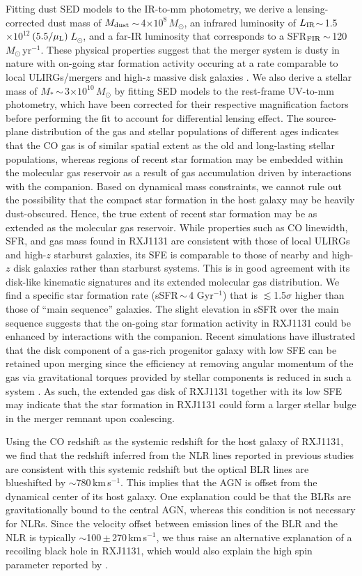 \documentclass[]{emulateapj}
\newcommand{\Msun}{\mbox{$M_{\odot}$}\xspace}
\newcommand{\Lsun}{\mbox{$L_{\odot}$}\xspace}
\newcommand{\LIR}{\mbox{$L_{\rm IR}$}\xspace}
\newcommand{\kms}{\mbox{km\,s$^{-1}$}\xspace}
\newcommand{\pmOne}{\mbox{$^{-1}$}\xspace}
\newcommand{\sfrU}{\mbox{\Msun\,yr$^{-1}$}\xspace}
\newcommand{\E}[1]{\mbox{$\times10^{#1}$}}
\newcommand{\ssim}{\,$\sim$\,}
\newcommand{\pmm}{\,$\pm$\,}
\newcommand{\SF}{star formation\xspace}
\newcommand{\SB}{starburst\xspace}
\begin{document}
Fitting dust SED models to the IR-to-mm photometry, we derive
a lensing-corrected dust mass of $M_{\rm dust}$\ssim4\E{8}\,\Msun,
an infrared luminosity of \LIR$\sim$\,1.5\E{12}\,$(5.5/\mu_{\rm L})$\,\Lsun,
and a far-IR luminosity that corresponds to a SFR$_{\rm FIR}$\ssim120\,\sfrU.
These physical properties suggest that the merger system is dusty in nature with on-going \SF activity occuring
at a rate comparable to local ULIRGs/mergers and high-$z$ massive disk galaxies \citep{dacunha10a, Daddi10a}.
We also derive a stellar mass of $M_{*}$\ssim3\E{10}\,\Msun by fitting SED models to the
rest-frame UV-to-mm photometry, which have been corrected for their respective magnification factors before performing the fit to
account for differential lensing effect.
The source-plane distribution of the gas and stellar populations of different ages
indicates that the CO gas is of similar spatial extent as the old and long-lasting stellar populations,
whereas regions of recent \SF may be embedded within the molecular gas reservoir as a result of
gas accumulation driven by interactions with the companion.
Based on dynamical mass constraints, we cannot rule out the possibility that the
compact \SF in the host galaxy
may be heavily dust-obscured.
Hence, the true extent of recent \SF may be as extended as the molecular gas
reservoir.
While properties such as CO linewidth, SFR, and gas mass found in RXJ1131
are consistent with those of local ULIRGs and high-$z$ starburst galaxies,
its SFE is comparable to those of nearby and high-$z$ disk galaxies rather than
\SB systems. This is in good agreement with its disk-like kinematic signatures and its extended molecular gas distribution.
We find a specific \SF rate (sSFR\ssim4 Gyr\pmOne) that is $\lesssim$1.5$\sigma$ higher than those of ``main sequence'' galaxies.
The slight elevation in sSFR over the main sequence suggests that
the on-going star formation activity in RXJ1131 could be enhanced by interactions with the companion.
Recent simulations have illustrated that the disk component of a gas-rich
progenitor galaxy with low SFE can be
retained upon merging since the efficiency at removing angular momentum of the gas via
gravitational torques provided by stellar components is reduced in such a system \citep{Springel05a, Robertson06a, Hopkins09a}.
As such, the extended gas disk of RXJ1131 together with its low SFE may indicate
that the \SF in RXJ1131 could form a
larger stellar bulge in the merger remnant upon coalescing.

Using the CO redshift as the systemic redshift for the host galaxy of RXJ1131, we find
that the redshift inferred from the NLR lines reported in previous studies are consistent with this systemic redshift
but the optical BLR lines are blueshifted by $\sim$780\,\kms.
This implies that the AGN is offset from the dynamical center of its host galaxy.
One explanation could be that the
BLRs are gravitationally bound to the central AGN, whereas this condition is not necessary for NLRs.
Since the velocity offset between emission lines of the BLR and the NLR
is typically $\sim$100\pmm270\,\kms,
we thus raise an alternative explanation of a recoiling black hole in RXJ1131, which
would also explain the high spin parameter reported by \citet{Reis14a}.
\end{document}
